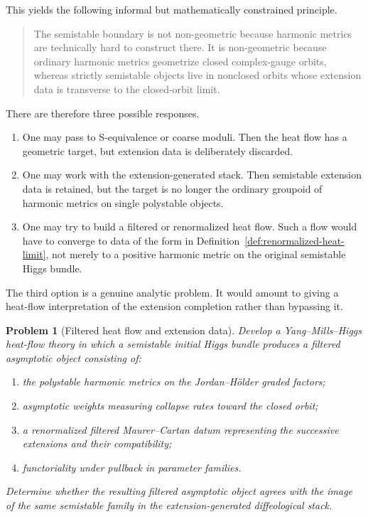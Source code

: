 \documentclass[11pt,reqno]{amsart}
\newtheorem{problem}[theorem]{Problem}
\theoremstyle{definition}
\theoremstyle{remark}
\begin{document}
This yields the following informal but mathematically constrained principle.

\begin{quote}
The semistable boundary is not non-geometric because harmonic metrics are technically hard to construct there.  It is non-geometric because ordinary harmonic metrics geometrize closed complex-gauge orbits, whereas strictly semistable objects live in nonclosed orbits whose extension data is transverse to the closed-orbit limit.
\end{quote}

There are therefore three possible responses.
\begin{enumerate}[label=(\roman*)]
\item One may pass to S-equivalence or coarse moduli.  Then the heat flow has a geometric target, but extension data is deliberately discarded.
\item One may work with the extension-generated stack.  Then semistable extension data is retained, but the target is no longer the ordinary groupoid of harmonic metrics on single polystable objects.
\item One may try to build a filtered or renormalized heat flow.  Such a flow would have to converge to data of the form in Definition~\ref{def:renormalized-heat-limit}, not merely to a positive harmonic metric on the original semistable Higgs bundle.
\end{enumerate}

The third option is a genuine analytic problem.  It would amount to giving a heat-flow interpretation of the extension completion rather than bypassing it.

\begin{problem}[Filtered heat flow and extension data]\label{prob:filtered-heat-flow}
Develop a Yang--Mills--Higgs heat-flow theory in which a semistable initial Higgs bundle produces a filtered asymptotic object consisting of:
\begin{enumerate}[label=(\alph*)]
\item the polystable harmonic metrics on the Jordan--H\"older graded factors;
\item asymptotic weights measuring collapse rates toward the closed orbit;
\item a renormalized filtered Maurer--Cartan datum representing the
successive extensions and their compatibility;
\item functoriality under pullback in parameter families.
\end{enumerate}
Determine whether the resulting filtered asymptotic object agrees with the image of the same semistable family in the extension-generated diffeological stack.
\end{problem}
\end{document}
